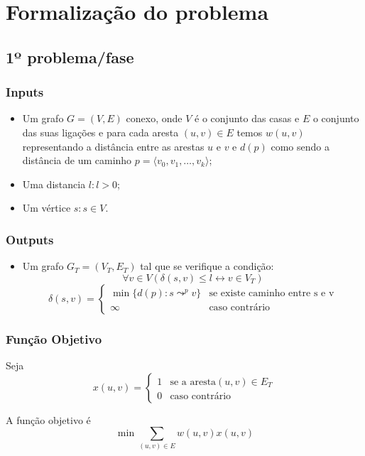 \documentclass[a4paper,12pt,titlepage]{article}
\let\biconditional\leftrightarrow
\begin{document}
\newpage
\section{Formalização do problema}

\subsection{1º problema/fase}
\subsubsection*{Inputs}
\begin{itemize}
\item Um grafo  $G= ( V, E ) $ conexo, onde $V$ é o conjunto das casas e $E$ o conjunto das suas ligações e para cada aresta $(u,v)\in E$ temos $w(u,v)$ representando a distância entre as arestas $u$ e $v$ e $d(p)$ como sendo a distância de um caminho $p = \langle v_0,v_1,\ldots , v_k\rangle$\cite[p.~624]{intro_algo};
\item Uma distancia $l:l > 0$;
\item Um vértice $s:s\in V$.
\end{itemize}

\subsubsection*{Outputs}
\begin{itemize}
\item Um grafo $G_T = ( V_T,E_T )$ tal que se verifique a condição\cite[p.~643]{intro_algo}:
$$ \forall v \in V(\delta(s,v) \leq l \biconditional v \in V_T)$$
$$\delta(s,v) = 
\begin{cases}
\min \{d(p): s \leadsto^p v\} & \text{se existe caminho entre s e v}\\
\infty & \text{caso contrário} 
\end{cases}$$
\end{itemize}

\subsubsection*{Função Objetivo}
Seja $$x(u,v) = \begin{cases}	
1 & \text{se a aresta} (u,v) \in E_T\\
0 & \text{caso contrário} 
\end{cases}$$

A função objetivo é\cite{ieor_mst}
$$\min \sum_{(u,v)\in E} w(u,v)x(u,v)$$
\end{document}
